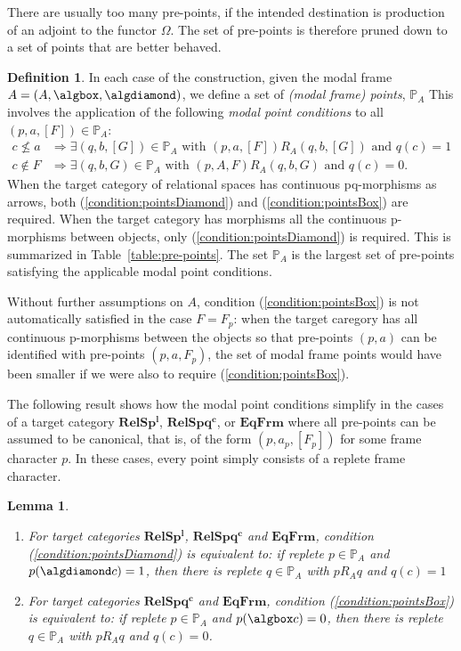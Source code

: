 \documentclass{article}[a4paper]
\newtheorem{lemma}{Lemma}%
\theoremstyle{definition}
\newtheorem{definition}{Definition}%
\newcommand{\relspl}{\mathbf{RelSp^l}}
\newcommand{\relspqc}{\mathbf{RelSpq^c}}
\newcommand{\eqfrm}{\mathbf{EqFrm}}
\newcommand{\Pbb}{\mathbb{P}}
\begin{document}
There are usually too many pre-points,  if the intended destination is production of an adjoint to the functor $\Omega$. The set of pre-points is therefore pruned down to a set of points that are better behaved.

\begin{definition}
In each case of the construction, given the modal frame $A = (A , \algbox , \algdiamond )$, we define a set of \emph{(modal frame) points}, $
\Pbb _A$
This involves the application of the following \emph{modal point conditions} to all $(p,a,[F]) \in \Pbb _A$: 
\begin{align}
\label{condition:pointsDiamond}
c \nleq a 
& \Longrightarrow 
\exists (q,b,[G]) \in \Pbb_A \mbox{ with }
(p,a,[F]) R_A (q,b,[G]) 
\mbox{ and } q(c)=1\\ 
\label{condition:pointsBox}
c \notin F
& \Longrightarrow 
\exists (q,b,G) \in \Pbb_A 
\mbox{ with }
(p,A,F) R_A (q,b,G) 
\mbox{ and 
}
q(c)=0.
\end{align}
When the target category of relational spaces has continuous pq-morphisms as arrows, both (\ref{condition:pointsDiamond}) and (\ref{condition:pointsBox}) are required. When the target category has morphisms all the continuous p-morphisms between objects, only (\ref{condition:pointsDiamond}) is required.
This is summarized in Table~\ref{table:pre-points}. The set $\Pbb _A$ is the largest set of pre-points satisfying the applicable modal point conditions.
\end{definition}

Without further assumptions on $A$,  condition (\ref{condition:pointsBox}) is not automatically satisfied in the case $F=F_p$: when the target caregory has all continuous p-morphisms between the objects so that pre-points $(p,a)$ can be identified with pre-points $(p,a,F_p)$, the set of modal frame points would have been smaller if we were also to require (\ref{condition:pointsBox}). 

The following result shows how the modal point conditions simplify in the cases of a target category $\relspl$, $\relspqc$, or $\eqfrm$ where all pre-points can be assumed to be canonical, that is, of the form $(p,a_p,[F_p])$ for some frame character $p$. In these cases, every point simply consists of a replete frame character.

\begin{lemma}
    \begin{enumerate}
    \item For target categories $\relspl$, $\relspqc$ and $\eqfrm$, condition (\ref{condition:pointsDiamond}) is equivalent to: if 
    replete $p \in \Pbb_A$  and $p(\algdiamond c) = 1$, then there is replete $q \in \Pbb_A$ with $p R_A q$ and $q(c)=1$
    \item For target categories $\relspqc$ and $\eqfrm$, condition (\ref{condition:pointsBox}) is equivalent to: if replete $p \in \Pbb _A$ and $p(\algbox c) = 0$, then there is replete $q \in \Pbb_A$ with $p R_A q$ and $q(c)=0$.
\end{enumerate}
\end{lemma}
\end{document}
